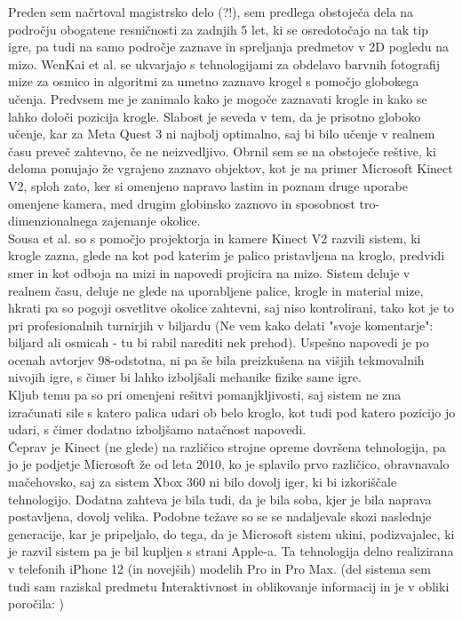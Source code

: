 \documentclass[a4paper, 12pt]{article}
\begin{document}
Preden sem načrtoval magistrsko delo (?!), sem predlega obstoječa dela na področju obogatene resničnosti
za zadnjih 5 let, ki se osredotočajo na tak tip igre, pa tudi na samo področje zaznave in
spreljanja predmetov v 2D pogledu na mizo. WenKai et al. \cite{WenKai2024} se ukvarjajo s tehnologijami za
obdelavo barvnih fotografij mize za osmico in algoritmi za umetno zaznavo krogel s pomočjo
globokega učenja. Predvsem me je zanimalo kako je mogoče zaznavati krogle in kako se lahko določi
pozicija krogle. Slabost je seveda v tem, da je prisotno globoko učenje, kar za Meta
Quest 3 ni najbolj optimalno, saj bi bilo učenje v realnem času preveč zahtevno, če ne neizvedljivo.
Obrnil sem se na obstoječe reštive, ki deloma ponujajo že vgrajeno zaznavo objektov, kot je na primer
Microsoft Kinect V2, sploh zato, ker si omenjeno napravo lastim in poznam druge uporabe omenjene
kamera, med drugim globinsko zaznovo in sposobnost tro-dimenzionalnega zajemanje okolice. \\
Sousa et al. \cite{Sousa2016} so s pomočjo projektorja in kamere Kinect V2 razvili sistem,
ki krogle zazna, glede na kot pod katerim je palico pristavljena na kroglo, predvidi smer in kot odboja
na mizi in napovedi projicira na mizo. Sistem deluje v realnem času, deluje ne glede na uporabljene palice,
krogle in material mize, hkrati pa so pogoji osvetlitve okolice zahtevni, saj niso kontrolirani, tako kot je
to pri profesionalnih turnirjih v biljardu (Ne vem kako delati "svoje komentarje": biljard ali osmicah - tu bi rabil
narediti nek prehod). Uspešno napovedi je po ocenah avtorjev 98-odstotna, ni pa še bila preizkušena na višjih tekmovalnih nivojih
igre, s čimer bi lahko izboljšali mehanike fizike same igre.  \\
Kljub temu pa so pri omenjeni rešitvi pomanjkljivosti, saj sistem ne zna izračunati
sile s katero palica udari ob belo kroglo, kot tudi pod katero pozicijo jo udari, s čimer
dodatno izboljšamo natačnost napovedi. \\
Čeprav je Kinect (ne glede) na različico strojne opreme dovršena tehnologija, pa jo je
podjetje Microsoft že od leta 2010, ko je splavilo prvo različico, obravnavalo mačehovsko,
saj za sistem Xbox 360 ni bilo dovolj iger, ki bi izkoriščale tehnologijo. Dodatna zahteva je bila
tudi, da je bila soba, kjer je bila naprava postavljena, dovolj velika. Podobne težave so se
se nadaljevale skozi naslednje generacije, kar je pripeljalo, do tega, da je Microsoft sistem
ukini, podizvajalec, ki je razvil sistem pa je bil kupljen s strani Apple-a. Ta tehnologija
delno realizirana v telefonih iPhone 12 (in novejših) modelih Pro in Pro Max. (del sistema sem tudi sam raziskal
predmetu Interaktivnost in  oblikovanje informacij in je v obliki poročila: )  \\
\end{document}
